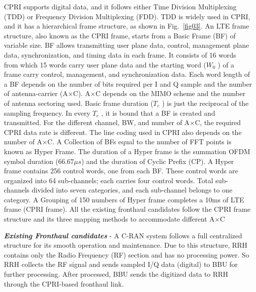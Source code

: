 \begin{multicols}{2}
CPRI supports digital data, and it follows either Time Division Multiplexing (TDD) or Frequency Division Multiplexing (FDD). TDD is widely used in CPRI, and it has a hierarchical frame structure, as shown in Fig.~\ref{fig03}. An LTE frame structure, also known as the CPRI frame, starts from a Basic Frame (BF) of variable size. BF allows transmitting user plane data, control, management plane data, synchronization, and timing data in each frame. It consists of 16 words from which 15 words carry user plane data and the starting word ($W_{0}$ ) of a  frame carry control, management, and synchronization data. Each word length of a BF depends on the number of bits required per I and Q sample and the number of antenna-carrier (A$\times$C). A$\times$C depends on the MIMO scheme and the number of antenna sectoring used. Basic frame duration ($T_{c}$ ) is just the reciprocal of the sampling frequency. In every $T_{c}$ , it is bound that a BF is created and transmitted. For the different channel, BW, and number of A$\times$C, the required CPRI data rate is different. The line coding used in CPRI also depends on the number of A$\times$C. A Collection of BFs equal to the number of FFT points is known as Hyper Frame. The duration of a Hyper frame is the summation OFDM symbol duration ($66.67 \mu s$) and the duration of Cyclic Prefix (CP). A Hyper frame contains 256 control words, one from each BF. These control words are organized into 64 sub-channels; each carries four control words. Total sub-channels divided into seven categories, and each sub-channel belongs to one category. A Grouping of 150 numbers of Hyper frame completes a 10ms of LTE frame (CPRI frame). All the existing fronthaul candidates follow the CPRI frame structure and its three mapping methods to accommodate different A$\times$C

\textit{\textbf {Existing Fronthaul candidates}} - A C-RAN system follows a full centralized structure for its smooth operation and maintenance. Due to this structure, RRH contains only the Radio Frequency (RF) section and has no processing power. So RRH collects the RF signal and sends sampled I/Q data (digital) to BBU for further processing. After processed, BBU sends the digitized data to RRH through the CPRI-based fronthaul link.


\end{multicols}
